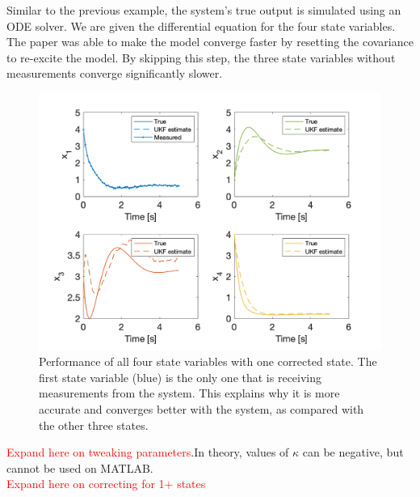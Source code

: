 \noindent Similar to the previous example, the system's true output is simulated using an ODE solver. We are given the differential equation for the four state variables. \\

\noindent The paper was able to make the model converge faster by resetting the covariance to re-excite the model. By skipping this step, the three state variables without measurements converge significantly slower.

\newpage

\begin{figure}[h]
    \centering
    \includegraphics[scale = 0.6]{Meskin_states.png}
    \caption{Performance of all four state variables with one corrected state. The first state variable (blue) is the only one that is receiving measurements from the system. This explains why it is more accurate and converges better with the system, as compared with the other three states.}
    \label{map}
\end{figure}




\noindent \textcolor{red}{Expand here on tweaking parameters}.In theory, values of $\kappa$ can be negative, but cannot be used on MATLAB. \\


\noindent \textcolor{red}{Expand here on correcting for 1+ states}
